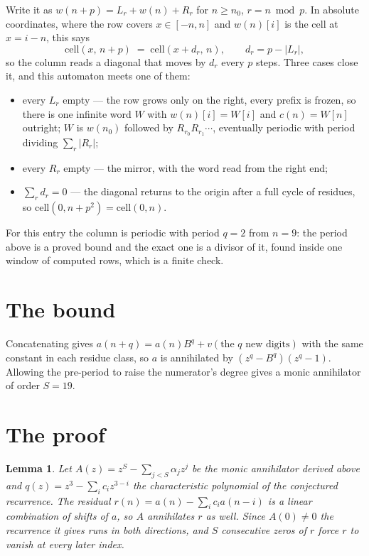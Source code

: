 \documentclass[11pt,a4paper]{article}
\theoremstyle{plain}
\newtheorem{lemma}[theorem]{Lemma}
\theoremstyle{definition}
\begin{document}
Write it as $w(n+p)=L_r+w(n)+R_r$ for $n\ge n_0$, $r=n \bmod p$. In absolute coordinates, where
the row covers $x\in[-n,n]$ and $w(n)[i]$ is the cell at $x=i-n$, this says
\[
\mathrm{cell}(x,\,n+p)\;=\;\mathrm{cell}(x+d_r,\,n),\qquad d_r=p-|L_r| ,
\]
so the column reads a diagonal that moves by $d_r$ every $p$ steps. Three cases close it, and
this automaton meets one of them:

\begin{itemize}
\item every $L_r$ empty --- the row grows only on the right, every prefix is frozen, so there
is one infinite word $W$ with $w(n)[i]=W[i]$ and $c(n)=W[n]$ outright; $W$ is $w(n_0)$ followed
by $R_{r_0}R_{r_1}\cdots$, eventually periodic with period dividing $\sum_r|R_r|$;
\item every $R_r$ empty --- the mirror, with the word read from the right end;
\item $\sum_r d_r=0$ --- the diagonal returns to the origin after a full cycle of residues, so
$\mathrm{cell}(0,n+p^2)=\mathrm{cell}(0,n)$.
\end{itemize}

For this entry the column is periodic with period $q=2$ from $n=9$: the period above is a
proved bound and the exact one is a divisor of it, found inside one window of computed rows,
which is a finite check.

\section{The bound}

Concatenating gives $a(n+q)=a(n)B^{q}+v(\text{the }q\text{ new digits})$ with the same constant in each residue class, so $a$ is annihilated by $(z^{q}-B^{q})(z^{q}-1)$.
Allowing the pre-period to raise the numerator's degree gives a monic annihilator of order
$S=19$.

\section{The proof}

\begin{lemma}\label{lem:crit}
Let $A(z)=z^S-\sum_{j<S}\alpha_jz^{j}$ be the monic annihilator derived above and
$q(z)=z^{3}-\sum_ic_iz^{3-i}$ the characteristic polynomial of the conjectured
recurrence. The residual $r(n)=a(n)-\sum_ic_ia(n-i)$ is a linear combination of shifts of $a$,
so $A$ annihilates $r$ as well. Since $A(0)\ne0$ the recurrence it gives runs in both
directions, and $S$ consecutive zeros of $r$ force $r$ to vanish at every later index.
\end{lemma}
\end{document}
